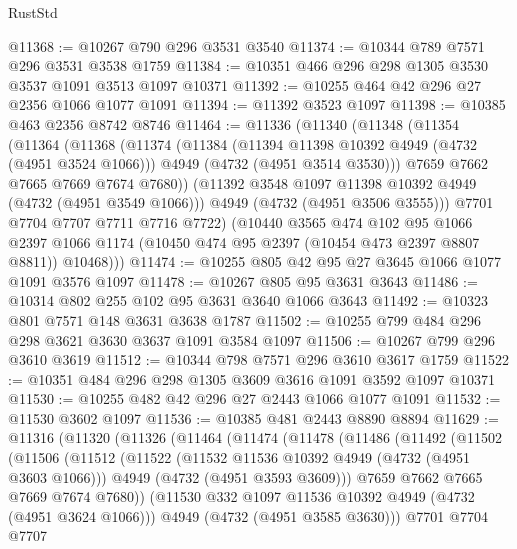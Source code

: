 \begin{lexlean}{RustStd}
\begin{coremodule}
@11368 := @10267 @790 @296 @3531 @3540
@11374 := @10344 @789 @7571 @296 @3531 @3538 @1759
@11384 := @10351 @466 @296 @298 @1305 @3530 @3537 @1091 @3513 @1097 @10371
@11392 := @10255 @464 @42 @296 @27 @2356 @1066 @1077 @1091
@11394 := @11392 @3523 @1097
@11398 := @10385 @463 @2356 @8742 @8746
@11464 := @11336
    (@11340
      (@11348
        (@11354
          (@11364
            (@11368
              (@11374
                (@11384
                  (@11394 @11398 @10392 @4949 (@4732 (@4951 @3524 @1066)))
                  @4949
                  (@4732 (@4951 @3514 @3530)))
                @7659
                @7662
                @7665
                @7669
                @7674
                @7680))
            (@11392 @3548 @1097 @11398 @10392 @4949 (@4732 (@4951 @3549 @1066)))
            @4949
            (@4732 (@4951 @3506 @3555)))
          @7701
          @7704
          @7707
          @7711
          @7716
          @7722)
        (@10440
          @3565
          @474
          @102
          @95
          @1066
          @2397
          @1066
          @1174
          (@10450 @474 @95 @2397 (@10454 @473 @2397 @8807 @8811))
          @10468)))
@11474 := @10255 @805 @42 @95 @27 @3645 @1066 @1077 @1091 @3576 @1097
@11478 := @10267 @805 @95 @3631 @3643
@11486 := @10314 @802 @255 @102 @95 @3631 @3640 @1066 @3643
@11492 := @10323 @801 @7571 @148 @3631 @3638 @1787
@11502 := @10255 @799 @484 @296 @298 @3621 @3630 @3637 @1091 @3584 @1097
@11506 := @10267 @799 @296 @3610 @3619
@11512 := @10344 @798 @7571 @296 @3610 @3617 @1759
@11522 := @10351 @484 @296 @298 @1305 @3609 @3616 @1091 @3592 @1097 @10371
@11530 := @10255 @482 @42 @296 @27 @2443 @1066 @1077 @1091
@11532 := @11530 @3602 @1097
@11536 := @10385 @481 @2443 @8890 @8894
@11629 := @11316
    (@11320
      (@11326
        (@11464
          (@11474
            (@11478
              (@11486
                (@11492
                  (@11502
                    (@11506
                      (@11512
                        (@11522
                          (@11532 @11536 @10392 @4949 (@4732 (@4951 @3603 @1066)))
                          @4949
                          (@4732 (@4951 @3593 @3609)))
                        @7659
                        @7662
                        @7665
                        @7669
                        @7674
                        @7680))
                    (@11530 @332 @1097 @11536 @10392 @4949 (@4732 (@4951 @3624 @1066)))
                    @4949
                    (@4732 (@4951 @3585 @3630)))
                  @7701
                  @7704
                  @7707

\end{coremodule}
\end{lexlean}
